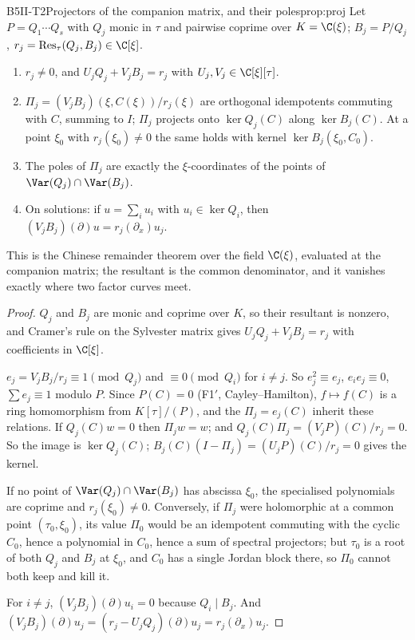 \begin{dimcard}{B5}{II-T2}{Projectors of the companion matrix, and their poles}{\proved}{prop:proj}
Let $P=Q_1\cdots Q_s$ with $Q_j$ monic in $\tau$ and pairwise coprime over $K=\C(\xi)$; $B_j=P/Q_j$, $r_j=\mathrm{Res}_\tau(Q_j,B_j)\in\C[\xi]$.
\begin{enumerate}[label=(\alph*)]
\item $r_j\ne0$, and $U_jQ_j+V_jB_j=r_j$ with $U_j,V_j\in\C[\xi][\tau]$.
\item $\Pi_j=(V_jB_j)(\xi,C(\xi))/r_j(\xi)$ are orthogonal idempotents commuting with $C$, summing to $I$; $\Pi_j$ projects onto $\ker Q_j(C)$ along $\ker B_j(C)$. At a point $\xi_0$ with $r_j(\xi_0)\ne0$ the same holds with kernel $\ker B_j(\xi_0,C_0)$.
\item The poles of $\Pi_j$ are exactly the $\xi$-coordinates of the points of $\Var(Q_j)\cap\Var(B_j)$.
\item On solutions: if $u=\sum_iu_i$ with $u_i\in\ker Q_i$, then $(V_jB_j)(\partial)u=r_j(\partial_x)u_j$.
\end{enumerate}
\end{dimcard}
\begin{proofidea}
This is the Chinese remainder theorem over the field $\C(\xi)$, evaluated at the companion matrix; the resultant is the common denominator, and it vanishes exactly where two factor curves meet.
\end{proofidea}
\begin{proof}
$Q_j$ and $B_j$ are monic and coprime over $K$, so their resultant is nonzero, and Cramer's rule on the Sylvester matrix gives $U_jQ_j+V_jB_j=r_j$ with coefficients in $\C[\xi]$.

$e_j=V_jB_j/r_j\equiv1\pmod{Q_j}$ and $\equiv0\pmod{Q_i}$ for $i\ne j$. So $e_j^2\equiv e_j$, $e_ie_j\equiv0$, $\sum e_j\equiv1$ modulo $P$. Since $P(C)=0$ (F1$'$, Cayley--Hamilton), $f\mapsto f(C)$ is a ring homomorphism from $K[\tau]/(P)$, and the $\Pi_j=e_j(C)$ inherit these relations. If $Q_j(C)w=0$ then $\Pi_jw=w$; and $Q_j(C)\Pi_j=(V_jP)(C)/r_j=0$. So the image is $\ker Q_j(C)$; $B_j(C)(I-\Pi_j)=(U_jP)(C)/r_j=0$ gives the kernel.

If no point of $\Var(Q_j)\cap\Var(B_j)$ has abscissa $\xi_0$, the specialised polynomials are coprime and $r_j(\xi_0)\ne0$. Conversely, if $\Pi_j$ were holomorphic at a common point $(\tau_0,\xi_0)$, its value $\Pi_0$ would be an idempotent commuting with the cyclic $C_0$, hence a polynomial in $C_0$, hence a sum of spectral projectors; but $\tau_0$ is a root of both $Q_j$ and $B_j$ at $\xi_0$, and $C_0$ has a single Jordan block there, so $\Pi_0$ cannot both keep and kill it.

For $i\ne j$, $(V_jB_j)(\partial)u_i=0$ because $Q_i\mid B_j$. And $(V_jB_j)(\partial)u_j=(r_j-U_jQ_j)(\partial)u_j=r_j(\partial_x)u_j$.
\end{proof}

